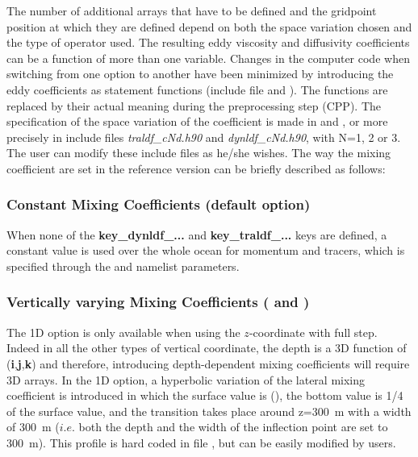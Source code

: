 \documentclass[NEMO_book]{subfiles}
\begin{document}
The number of additional arrays that have to be defined and the gridpoint 
position at which they are defined depend on both the space variation chosen 
and the type of operator used. The resulting eddy viscosity and diffusivity 
coefficients can be a function of more than one variable. Changes in the 
computer code when switching from one option to another have been 
minimized by introducing the eddy coefficients as statement functions
(include file  and ). The functions 
are replaced by their actual meaning during the preprocessing step (CPP). 
The specification of the space variation of the coefficient is made in 
 and , or more precisely in include files 
\textit{traldf\_cNd.h90} and \textit{dynldf\_cNd.h90}, with N=1, 2 or 3. 
The user can modify these include files as he/she wishes. The way the 
mixing coefficient are set in the reference version can be briefly described 
as follows:

\subsubsection{Constant Mixing Coefficients (default option)}
When none of the \textbf{key\_dynldf\_...} and \textbf{key\_traldf\_...} keys are 
defined, a constant value is used over the whole ocean for momentum and 
tracers, which is specified through the  and  namelist 
parameters.

\subsubsection{Vertically varying Mixing Coefficients ( and )} 
The 1D option is only available when using the $z$-coordinate with full step. 
Indeed in all the other types of vertical coordinate, the depth is a 3D function 
of (\textbf{i},\textbf{j},\textbf{k}) and therefore, introducing depth-dependent 
mixing coefficients will require 3D arrays. In the 1D option, a hyperbolic variation 
of the lateral mixing coefficient is introduced in which the surface value is 
 (), the bottom value is 1/4 of the surface value, 
and the transition takes place around z=300~m with a width of 300~m 
($i.e.$ both the depth and the width of the inflection point are set to 300~m). 
This profile is hard coded in file , but can be easily modified by users.
\end{document}
